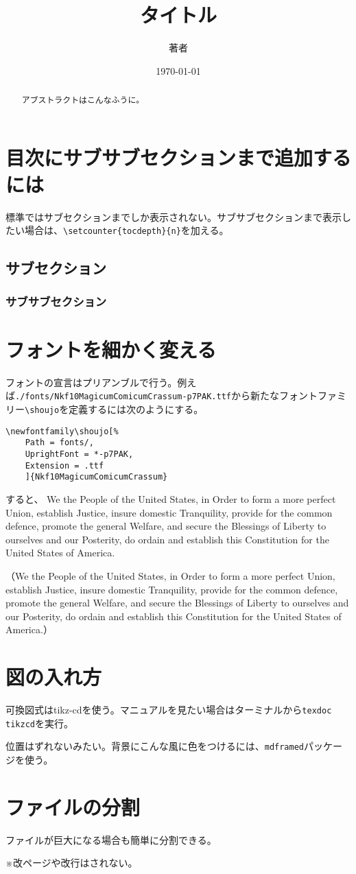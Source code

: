 \documentclass[a4paper]{ltjsarticle}
\author{著者}
\date{\和暦\today}
\title{タイトル}
\begin{document}
\maketitle
\setcounter{tocdepth}{3}
\tableofcontents
%
\begin{abstract}
    アブストラクトはこんなふうに。
\end{abstract}
%
%
\section{目次にサブサブセクションまで追加するには}

標準ではサブセクションまでしか表示されない。サブサブセクションまで表示したい場合は、\verb|\setcounter{tocdepth}{n}|を加える。
\subsection{サブセクション}
\subsubsection{サブサブセクション}
\section{フォントを細かく変える}
フォントの宣言はプリアンブルで行う。例えば\verb|./fonts/Nkf10MagicumComicumCrassum-p7PAK.ttf|から新たなフォントファミリー\verb|\shoujo|を定義するには次のようにする。
\begin{verbatim}
\newfontfamily\shoujo[%
    Path = fonts/,
    UprightFont = *-p7PAK,
    Extension = .ttf
    ]{Nkf10MagicumComicumCrassum}
\end{verbatim}
すると、
{\shoujo We the People of the United States, in Order to form a more perfect Union, establish Justice, insure domestic Tranquility, provide for the common defence, promote the general Welfare, and secure the Blessings of Liberty to ourselves and our Posterity, do ordain and establish this Constitution for the United States of America.}

（We the People of the United States, in Order to form a more perfect Union, establish Justice, insure domestic Tranquility, provide for the common defence, promote the general Welfare, and secure the Blessings of Liberty to ourselves and our Posterity, do ordain and establish this Constitution for the United States of America\cite{UScontrib}.）

\section{図の入れ方}
可換図式はtikz-cdを使う。マニュアルを見たい場合はターミナルから\verb|texdoc tikzcd|を実行。
\begin{mdframed}
\centering
{}
\end{mdframed}
位置はずれないみたい。背景にこんな風に色をつけるには、\verb|mdframed|パッケージを使う。

\section{ファイルの分割}
ファイルが巨大になる場合も簡単に分割できる。

※改ページや改行はされない。
%


\end{document}
